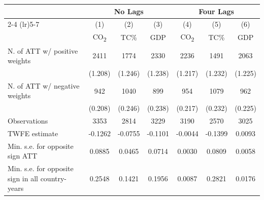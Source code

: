 \begin{tabular}{l*{6}{c}}
\hline
& \multicolumn{3}{c}{No Lags} & \multicolumn{3}{c}{Four Lags} \\
\cmidrule(lr){2-4} \cmidrule(lr){5-7}
            &\multicolumn{1}{c}{(1)}&\multicolumn{1}{c}{(2)}&\multicolumn{1}{c}{(3)}&\multicolumn{1}{c}{(4)}&\multicolumn{1}{c}{(5)}&\multicolumn{1}{c}{(6)}\\
            &\multicolumn{1}{c}{CO\textsubscript{2}}&\multicolumn{1}{c}{TC\%}&\multicolumn{1}{c}{GDP}&\multicolumn{1}{c}{CO\textsubscript{2}}&\multicolumn{1}{c}{TC\%}&\multicolumn{1}{c}{GDP}\\
\hline
N. of ATT w/ positive weights&        2411&        1774&        2330&        2236&        1491&        2063\\
            &     (1.208)&     (1.246)&     (1.238)&     (1.217)&     (1.232)&     (1.225)\\
N. of ATT w/ negative weights&         942&        1040&         899&         954&        1079&         962\\
            &     (0.208)&     (0.246)&     (0.238)&     (0.217)&     (0.232)&     (0.225)\\
\midrule
Observations&        3353&        2814&        3229&        3190&        2570&        3025\\
TWFE estimate&     -0.1262&     -0.0755&     -0.1101&     -0.0044&     -0.1399&      0.0093\\
Min. s.e. for opposite sign ATT&      0.0885&      0.0465&      0.0714&      0.0030&      0.0809&      0.0058\\
Min. s.e. for opposite sign in all country-years&      0.2548&      0.1421&      0.1956&      0.0087&      0.2821&      0.0176\\
\hline \end{tabular}

